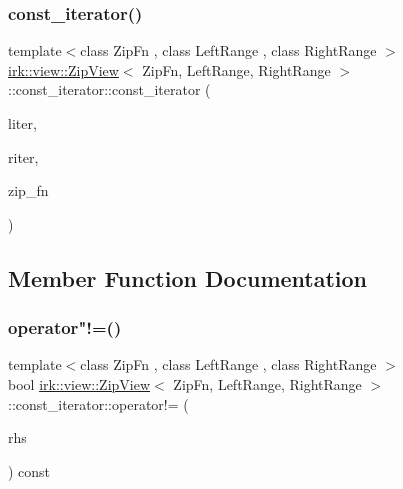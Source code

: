 \subsubsection{\texorpdfstring{const\+\_\+iterator()}{const\_iterator()}}
{\footnotesize\ttfamily template$<$class Zip\+Fn , class Left\+Range , class Right\+Range $>$ \\
\mbox{\hyperlink{classirk_1_1view_1_1ZipView}{irk\+::view\+::\+Zip\+View}}$<$ Zip\+Fn, Left\+Range, Right\+Range $>$\+::const\+\_\+iterator\+::const\+\_\+iterator (\begin{DoxyParamCaption}\item[{\mbox{\hyperlink{namespaceirk_a90f7893fdbf95c6dcc2302148eb0bddb}{const\+\_\+iterator\+\_\+t}}$<$ Left\+Range $>$}]{liter,  }\item[{\mbox{\hyperlink{namespaceirk_a90f7893fdbf95c6dcc2302148eb0bddb}{const\+\_\+iterator\+\_\+t}}$<$ Right\+Range $>$}]{riter,  }\item[{Zip\+Fn}]{zip\+\_\+fn }\end{DoxyParamCaption})\hspace{0.3cm}{\ttfamily [inline]}}



\subsection{Member Function Documentation}
\mbox{\label{classirk_1_1view_1_1ZipView_1_1const__iterator_acfba3a3b55f15c9485ae1f84d900d579}} 
\subsubsection{\texorpdfstring{operator"!=()}{operator!=()}}
{\footnotesize\ttfamily template$<$class Zip\+Fn , class Left\+Range , class Right\+Range $>$ \\
bool \mbox{\hyperlink{classirk_1_1view_1_1ZipView}{irk\+::view\+::\+Zip\+View}}$<$ Zip\+Fn, Left\+Range, Right\+Range $>$\+::const\+\_\+iterator\+::operator!= (\begin{DoxyParamCaption}\item[{const \mbox{\hyperlink{classirk_1_1view_1_1ZipView_1_1const__iterator}{const\+\_\+iterator}} \&}]{rhs }\end{DoxyParamCaption}) const\hspace{0.3cm}{\ttfamily [inline]}}

